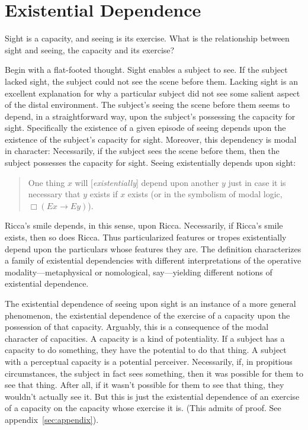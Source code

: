 \documentclass[12pt]{article}
\begin{document}


\section{Existential Dependence} %
\label{sec:capacities_and_their_exercise}

Sight is a capacity, and seeing is its exercise. What is the relationship between sight and seeing, the capacity and its exercise?

Begin with a flat-footed thought. Sight enables a subject to see. If the subject lacked sight, the subject could not see the scene before them. Lacking sight is an excellent explanation for why a particular subject did not see some salient aspect of the distal environment. The subject's seeing the scene before them seems to depend, in a straightforward way, upon the subject's possessing the capacity for sight. Specifically the existence of a given episode of seeing depends upon the existence of the subject's capacity for sight. Moreover, this dependency is modal in character: Necessarily, if the subject sees the scene before them, then the subject possesses the capacity for sight. Seeing existentially depends upon sight:
\begin{quote}
    One thing \( x \) will [\emph{existentially}] depend upon another \( y \) just in case it is necessary that \( y \) exists if \( x \) exists (or in the symbolism of modal logic, \( \Box(Ex \rightarrow Ey) \)). \citep[270]{Fine:1995ls} 
\end{quote}
Ricca's smile depends, in this sense, upon Ricca. Necessarily, if Ricca's smile exists, then so does Ricca. Thus particularized features or tropes existentially depend upon the particulars whose features they are. The definition characterizes a family of existential dependencies with different interpretations of the operative modality---metaphysical or nomological, say---yielding different notions of existential dependence. 

The existential dependence of seeing upon sight is an instance of a more general phenomenon, the existential dependence of the exercise of a capacity upon the possession of that capacity. Arguably, this is a consequence of the modal character of capacities. A capacity is a kind of potentiality. If a subject has a capacity to do something, they have the potential to do that thing. A subject with a perceptual capacity is a potential perceiver. Necessarily, if, in propitious circumstances, the subject in fact sees something, then it was possible for them to see that thing. After all, if it wasn't possible for them to see that thing, they wouldn't actually see it. But this is just the existential dependence of an exercise of a capacity on the capacity whose exercise it is. (This admits of proof. See appendix~\ref{sec:appendix}).
\end{document}
